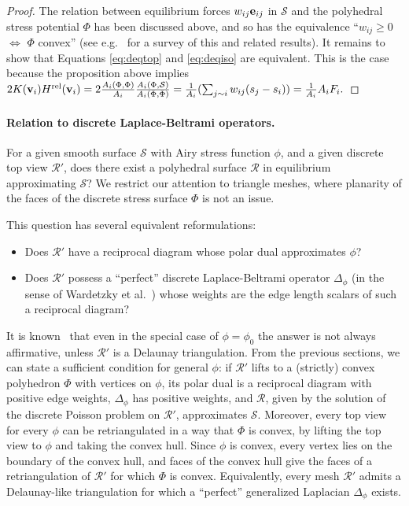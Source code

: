 \documentclass[annual]{acmsiggraph}
\def\rel{{\mathord{\text{\rm rel}}}}
\def\SS{{\mathcal S}}
\def\RR{{\mathcal R}}
\begin{document}
\begin{proof} The relation between equilibrium forces $w_{ij}{\mathbf e}_{ij}$ in
$\SS$ and the polyhedral stress potential $\Phi$ has been discussed above,
and so has the equivalence ``$w_{ij}\ge 0$ $\iff$ $\Phi$ convex'' (see
e.g.\ \cite{Ash1988} for a survey of this and related results). It remains
to show that Equations \eqref{eq:deqtop} and \eqref{eq:deqiso} are
equivalent. This is the case because the proposition above implies
	$
	2 K(\vw_i) H^\rel(\vw_i) =
	2 \frac{A_i(\Phi,\Phi)}{A_i}
	\frac{A_i(\Phi,\SS)}{A_i(\Phi,\Phi)} =
	{1\over A_i}
	(\sum_{j\sim i} w_{ij} (s_j-s_i))
	= {1\over A_i} A_i F_i.
	$
	\end{proof}
\paragraph{Relation to discrete Laplace-Beltrami operators.}
For a given smooth surface $\SS$ with Airy stress function $\phi$, and a given
discrete top view $\RR'$, does there exist a polyhedral surface $\RR$ in equilibrium
approximating $\SS$? We restrict our attention to triangle meshes, where planarity of the faces
of the discrete stress surface $\Phi$ is not an issue.

This question has several equivalent reformulations:
\begin{itemize}
\item Does $\RR'$ have a reciprocal diagram whose polar dual approximates $\phi$?
\item Does $\RR'$ possess a ``perfect'' discrete Laplace-Beltrami operator $\Delta_\phi$ (in the sense of Wardetzky et al.~)
whose weights are the edge length scalars of such a reciprocal diagram?
\end{itemize}
It is known~\cite{wardetzky07} that even in the special case of $\phi=\phi_0$ the answer is not always affirmative, unless
$\RR'$ is a Delaunay triangulation. From the previous sections, we can state a sufficient condition for general $\phi$: if
$\RR'$ lifts to a (strictly) convex polyhedron $\Phi$ with vertices on $\phi$, its polar dual is a reciprocal diagram with positive edge weights,
$\Delta_\phi$ has positive weights, and $\RR$, given by the solution of the discrete Poisson problem on $\RR'$, approximates $\SS$.
Moreover, every top view for every $\phi$ can be retriangulated in a way that $\Phi$ is convex, by lifting the top view to $\phi$ and taking the
convex hull. Since $\phi$ is convex, every vertex lies on the boundary of the convex hull, and faces of the convex hull give the faces of a
retriangulation of $\RR'$ for which $\Phi$ is convex. Equivalently, every mesh $\RR'$ admits a Delaunay-like triangulation for which a
``perfect'' generalized Laplacian $\Delta_\phi$ exists.
\end{document}
